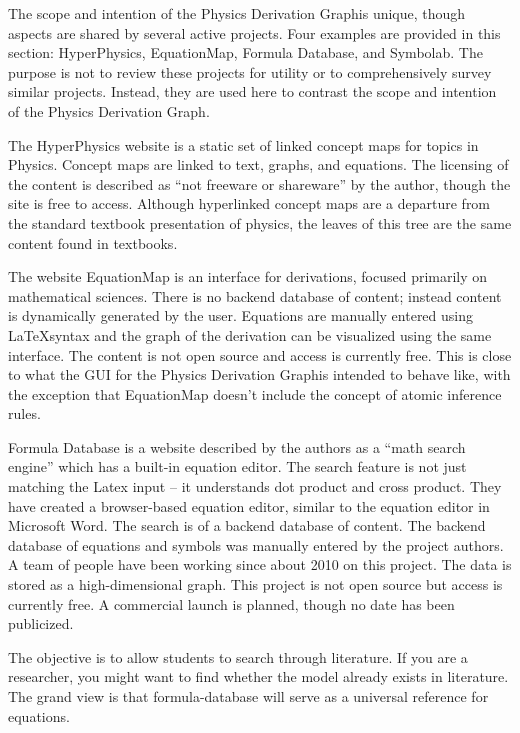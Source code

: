 \documentclass{article}
\newcommand{\pdg}{Physics Derivation Graph}
\begin{document}
\begin{multicols}{2}
The scope and intention of the \pdg is unique, though aspects are shared by several active projects. Four examples are provided in this section: HyperPhysics, EquationMap, Formula Database, and Symbolab. The purpose is not to review these projects for utility or to comprehensively survey similar projects. Instead, they are used here to contrast the scope and intention of the \pdg. 

The HyperPhysics website\cite{2015_Hyperphysics} is a static set of linked concept maps for topics in Physics. Concept maps are linked to text, graphs, and equations. The licensing of the content is described as ``not freeware or shareware'' by the author, though the site is free to access. Although hyperlinked concept maps are a departure from the standard textbook presentation of physics, the leaves of this tree are the same content found in textbooks. 

The website EquationMap\cite{2015_EquationMap} is an interface for derivations, focused primarily on mathematical sciences. There is no backend database of content; instead content is dynamically generated by the user. Equations are manually entered using \LaTeX syntax and the graph of the derivation can be visualized using the same interface. The content is not open source and access is currently free. This is close to what the GUI for the \pdg is intended to behave like, with the exception that EquationMap doesn't include the concept of atomic inference rules.


Formula Database\cite{2015_FormulaDatabase} is a website described by the authors as a ``math search engine'' which has a built-in equation editor. The search feature is not just matching the Latex input -- it understands dot product and cross product. They have created a browser-based equation editor, similar to the equation editor in Microsoft Word. The search is of a backend database of content. The backend database of equations and symbols was manually entered by the project authors. A team of people have been working since about 2010 on this project. The data is stored as a high-dimensional graph. This project is not open source but access is currently free. A commercial launch is planned, though no date has been publicized. 

The objective is to allow students to search through literature. If you are a researcher, you might want to find whether the model already exists in literature. The grand view is that formula-database will serve as a universal reference for equations.



\end{multicols}
\end{document}
